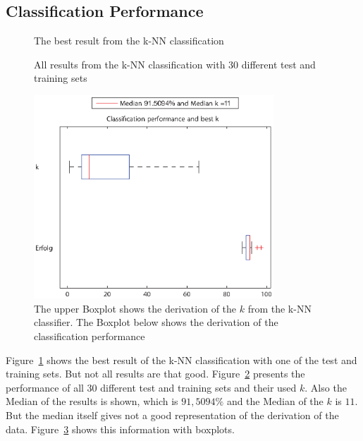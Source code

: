 \documentclass[subfigure,epsfig,fleqn,amssmb,float,caption,ausarbeitung]{scrartcl}
\begin{document}
\subsection{Classification Performance}
\label{sec:kNNperformance}

\begin{figure}
	\centering
	\setlength\figureheight{6cm} 
	\setlength\figurewidth{7cm}
	
	\caption{The best result from the k-NN classification}
	\label{fig:bestresult}
\end{figure}

\begin{figure}
	\centering
	\setlength\figureheight{6cm} 
	\setlength\figurewidth{7cm}
	
	\caption{All results from the k-NN classification with 30 different test and training sets}
	\label{fig:allresults}
\end{figure}

\begin{figure}
		\centering
			\includegraphics[width=9cm]{img/boxresults.eps}
		\caption{The upper Boxplot shows the derivation of the $k$ from the k-NN 
classifier. The Boxplot below shows the derivation of the classification performance}
		\label{fig:boxresults}
	\end{figure}

Figure~\ref{fig:bestresult} shows the best result of the k-NN classification 
with one of the test and training sets. But not all results are that good. 
Figure~\ref{fig:allresults} presents the performance of all 30 different test 
and training sets and their used $k$. Also the Median of the results is shown, 
which is $91,5094\%$ and the Median of the $k$ is $11$. But the median itself 
gives not a good representation of the derivation of the data. 
Figure~\ref{fig:boxresults} shows this information with boxplots.
\end{document}
